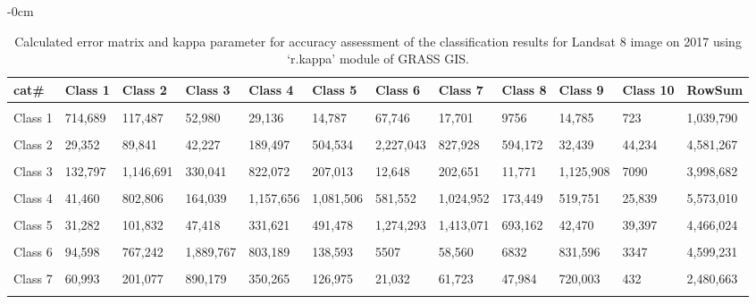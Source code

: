 \documentclass[analytics,article,accept,pdftex,moreauthors]{Definitions/mdpi}
\begin{document}
\begin{table}[H] 
 
    \caption{Calculated error matrix and kappa parameter for accuracy assessment of the classification results for Landsat 8 image on 2017 using `r.kappa' module of GRASS GIS.}%
    \begin{adjustwidth}{-\extralength}{0cm}
 	\begin{tabularx}{\fulllength}{lllllllllllL}
    \toprule
        \textbf{cat\#} & \textbf{Class 1} & \textbf{Class 2} & \textbf{Class 3} & \textbf{Class 4} & \textbf{Class 5} & \textbf{Class 6} & \textbf{Class 7} & \textbf{Class 8} & \textbf{Class 9} & \textbf{Class 10} & \textbf{RowSum} \\ \hline
      &&&&&&&&&&&\\[-2ex]
        Class 1 & 714,689 & 117,487 & 52,980 & 29,136 & 14,787 & 67,746 & 17,701 & 9756 & 14,785 & 723 & 1,039,790 \\ \hline
      &&&&&&&&&&&\\[-2ex]
        Class 2 & 29,352 & 89,841 & 42,227 & 189,497 & 504,534 & 2,227,043 & 827,928 & 594,172 & 32,439 & 44,234 & 4,581,267 \\ \hline
      &&&&&&&&&&&\\[-2ex]
        Class 3 & 132,797 & 1,146,691 & 330,041 & 822,072 & 207,013 & 12,648 & 202,651 & 11,771 & 1,125,908 & 7090 & 3,998,682 \\ \hline
      &&&&&&&&&&&\\[-2ex]
        Class 4 & 41,460 & 802,806 & 164,039 & 1,157,656 & 1,081,506 & 581,552 & 1,024,952 & 173,449 & 519,751 & 25,839 & 5,573,010 \\ \hline
      &&&&&&&&&&&\\[-2ex]
        Class 5 & 31,282 & 101,832 & 47,418 & 331,621 & 491,478 & 1,274,293 & 1,413,071 & 693,162 & 42,470 & 39,397 & 4,466,024 \\ \hline
      &&&&&&&&&&&\\[-2ex]
        Class 6 & 94,598 & 767,242 & 1,889,767 & 803,189 & 138,593 & 5507 & 58,560 & 6832 & 831,596 & 3347 & 4,599,231 \\ \hline
      &&&&&&&&&&&\\[-2ex]
        Class 7 & 60,993 & 201,077 & 890,179 & 350,265 & 126,975 & 21,032 & 61,723 & 47,984 & 720,003 & 432 & 2,480,663 \\ \hline
      &&&&&&&&&&&\\[-2ex]

\end{tabularx}
\end{adjustwidth}
\end{table}
\end{document}
